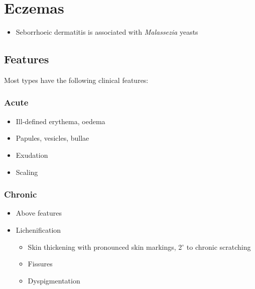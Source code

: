 \documentclass[
  12pt,
]{memoir}
\providecommand{\tightlist}{%
  \setlength{\itemsep}{0pt}\setlength{\parskip}{0pt}}
\begin{document}
\pagebreak

\hypertarget{eczemas}{%
\section{Eczemas}\label{eczemas}}

\begin{itemize}
\tightlist
\item
  Seborrhoeic dermatitis is associated with \emph{Malassezia} yeasts
\end{itemize}

\hypertarget{features-1}{%
\subsection{Features}\label{features-1}}

Most types have the following clinical features:

\hypertarget{acute}{%
\subsubsection{Acute}\label{acute}}

\begin{itemize}
\tightlist
\item
  Ill-defined erythema, oedema
\item
  Papules, vesicles, bullae
\item
  Exudation
\item
  Scaling
\end{itemize}

\hypertarget{chronic}{%
\subsubsection{Chronic}\label{chronic}}

\begin{itemize}
\tightlist
\item
  Above features
\item
  Lichenification

  \begin{itemize}
  \tightlist
  \item
    Skin thickening with pronounced skin markings, 2\(^\circ\) to
    chronic scratching
  \item
    Fissures
  \item
    Dyspigmentation
  \end{itemize}
\end{itemize}
\end{document}
